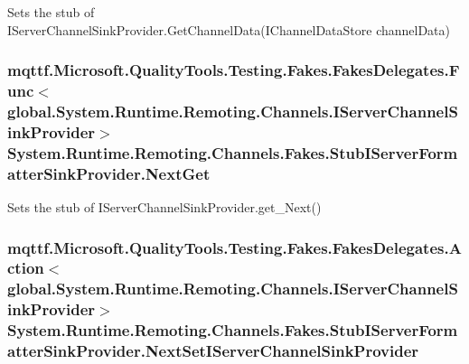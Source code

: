Sets the stub of I\-Server\-Channel\-Sink\-Provider.\-Get\-Channel\-Data(\-I\-Channel\-Data\-Store channel\-Data)

\hypertarget{class_system_1_1_runtime_1_1_remoting_1_1_channels_1_1_fakes_1_1_stub_i_server_formatter_sink_provider_a3b562dfa75c109e03b06175f747f274c}{
\subsubsection[{Next\-Get}]{\setlength{\rightskip}{0pt plus 5cm}mqttf.\-Microsoft.\-Quality\-Tools.\-Testing.\-Fakes.\-Fakes\-Delegates.\-Func$<$global.\-System.\-Runtime.\-Remoting.\-Channels.\-I\-Server\-Channel\-Sink\-Provider$>$ System.\-Runtime.\-Remoting.\-Channels.\-Fakes.\-Stub\-I\-Server\-Formatter\-Sink\-Provider.\-Next\-Get}}\label{class_system_1_1_runtime_1_1_remoting_1_1_channels_1_1_fakes_1_1_stub_i_server_formatter_sink_provider_a3b562dfa75c109e03b06175f747f274c}


Sets the stub of I\-Server\-Channel\-Sink\-Provider.\-get\-\_\-\-Next()

\hypertarget{class_system_1_1_runtime_1_1_remoting_1_1_channels_1_1_fakes_1_1_stub_i_server_formatter_sink_provider_ac961f1bf936af25ab8a6a9783ae8020d}{
\subsubsection[{Next\-Set\-I\-Server\-Channel\-Sink\-Provider}]{\setlength{\rightskip}{0pt plus 5cm}mqttf.\-Microsoft.\-Quality\-Tools.\-Testing.\-Fakes.\-Fakes\-Delegates.\-Action$<$global.\-System.\-Runtime.\-Remoting.\-Channels.\-I\-Server\-Channel\-Sink\-Provider$>$ System.\-Runtime.\-Remoting.\-Channels.\-Fakes.\-Stub\-I\-Server\-Formatter\-Sink\-Provider.\-Next\-Set\-I\-Server\-Channel\-Sink\-Provider}}\label{class_system_1_1_runtime_1_1_remoting_1_1_channels_1_1_fakes_1_1_stub_i_server_formatter_sink_provider_ac961f1bf936af25ab8a6a9783ae8020d}


